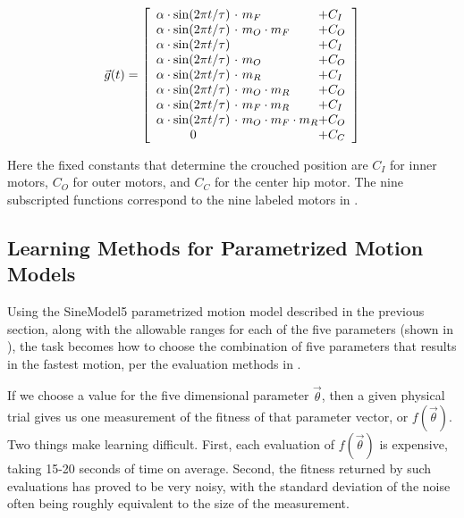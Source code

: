 \[
\vec{g}(t) =
\left[ {\begin{array}{c@{ }l@{ }l}
\amp \cdot \sin(2\pi t / \tau) & \ \cdot \           m_F            & + C_I \\ %
\amp \cdot \sin(2\pi t / \tau) & \ \cdot \ m_O \cdot m_F            & + C_O \\ %
\amp \cdot \sin(2\pi t / \tau) & \                                  & + C_I \\ %
\amp \cdot \sin(2\pi t / \tau) & \ \cdot \ m_O                      & + C_O \\ %
\amp \cdot \sin(2\pi t / \tau) & \ \cdot \                     m_R  & + C_I \\ %
\amp \cdot \sin(2\pi t / \tau) & \ \cdot \ m_O           \cdot m_R  & + C_O \\ %
\amp \cdot \sin(2\pi t / \tau) & \ \cdot \           m_F \cdot m_R  & + C_I \\ %
\amp \cdot \sin(2\pi t / \tau) & \ \cdot \ m_O \cdot m_F \cdot m_R  & + C_O \\ %
0                              & \                                  & + C_C \\ %
\end{array} } \right]
\]

\noindent Here the fixed constants that determine the crouched
position are $C_I$ for inner motors, $C_O$ for outer motors, and $C_C$
for the center hip motor.  The nine subscripted functions correspond
to the nine labeled motors in .



\subsection{Learning Methods for Parametrized Motion Models}

Using the SineModel5 parametrized motion model described in the
previous section, along with the allowable ranges for each of the five
parameters (shown in ), the task becomes how to
choose the combination of five parameters that results in the fastest
motion, per the evaluation methods in .

If we choose a value for the five dimensional parameter
$\vec{\theta}$, then a given physical trial gives us one measurement
of the fitness of that parameter vector, or $f(\vec{\theta})$.  Two
things make learning difficult.  First, each evaluation of
$f(\vec{\theta})$ is expensive, taking 15-20 seconds of time on
average.  Second, the fitness returned by such evaluations has proved
to be very noisy, with the standard deviation of the noise often being
roughly equivalent to the size of the measurement.

